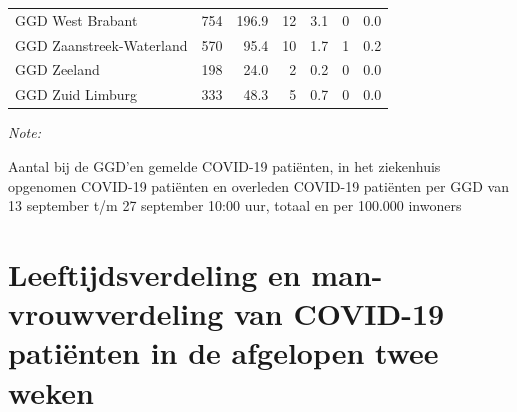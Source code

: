\documentclass[
  english,
  man,floatsintext]{apa6}
\begin{document}
\begin{table}[H]
\begin{threeparttable}
\begin{tabular}{lrrrrrr}
GGD West Brabant & 754 & 196.9 & 12 & 3.1 & 0 & 0.0\\
GGD Zaanstreek-Waterland & 570 & 95.4 & 10 & 1.7 & 1 & 0.2\\
GGD Zeeland & 198 & 24.0 & 2 & 0.2 & 0 & 0.0\\
GGD Zuid Limburg & 333 & 48.3 & 5 & 0.7 & 0 & 0.0\\
\bottomrule
\end{tabular}
\begin{tablenotes}
\item \textit{Note: } 
\item Aantal bij de GGD’en gemelde COVID-19 patiënten, in het ziekenhuis opgenomen COVID-19 patiënten en overleden COVID-19 patiënten per GGD van 13 september t/m 27 september 10:00 uur, totaal en per 100.000 inwoners
\end{tablenotes}
\end{threeparttable}
\endgroup{}
\end{table}

\newpage

\hypertarget{leeftijdsverdeling-en-man-vrouwverdeling-van-covid-19-patiuxebnten-in-de-afgelopen-twee-weken}{%
\section{Leeftijdsverdeling en man-vrouwverdeling van COVID-19 patiënten in de afgelopen twee weken}\label{leeftijdsverdeling-en-man-vrouwverdeling-van-covid-19-patiuxebnten-in-de-afgelopen-twee-weken}}
\end{document}
